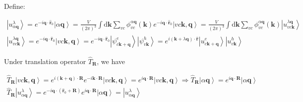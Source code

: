 \noindent
Define:

\begin{equation}
  \begin{gathered}
    \left| u_{\alpha\boldsymbol{q}}^{\lambda} \right\rangle 
    = e^{-i\boldsymbol{q} \cdot \hat{\boldsymbol{r}}_0} \left| \alpha\boldsymbol{q} \right\rangle 
    = \frac{V}{(2\pi)^3} \int \mathrm{d}\boldsymbol{k} \sum_{vc} \phi_{vc}^{\alpha \boldsymbol{q}}(\boldsymbol{k}) 
      e^{-i\boldsymbol{q} \cdot \hat{\boldsymbol{r}}_0} \left| v c \boldsymbol{k}, \boldsymbol{q} \right\rangle
    = \frac{V}{(2\pi)^3} \int \mathrm{d}\boldsymbol{k} \sum_{vc} \phi_{vc}^{\alpha \boldsymbol{q}}(\boldsymbol{k}) 
      \left| u_{v c \boldsymbol{k}}^{\lambda\boldsymbol{q}} \right\rangle \\
    \left| u_{v c \boldsymbol{k}}^{\lambda\boldsymbol{q}} \right\rangle 
    = e^{-i\boldsymbol{q} \cdot \hat{\boldsymbol{r}}_0} \left| v c \boldsymbol{k}, \boldsymbol{q} \right\rangle 
    = e^{-i\boldsymbol{q} \cdot \hat{\boldsymbol{r}}_0} 
      \left| \psi_{c\boldsymbol{k}+\boldsymbol{q}}^{e} \right\rangle \left| \psi_{v\boldsymbol{k}}^{h} \right\rangle 
    = e^{i(\boldsymbol{k}+\lambda\boldsymbol{q}) \cdot \hat{\boldsymbol{r}}} 
      \left| u_{c\boldsymbol{k}+\boldsymbol{q}}^{e} \right\rangle \left| u_{v\boldsymbol{k}}^{h} \right\rangle 
  \end{gathered}
\end{equation}

\noindent
Under translation operator $\hat{T}_{\boldsymbol{R}}$, we have

\begin{equation}
  \begin{gathered}
    \hat{T}_{\boldsymbol{R}} \left| v c \boldsymbol{k}, \boldsymbol{q} \right\rangle 
    = e^{i(\boldsymbol{k} + \boldsymbol{q})\cdot\boldsymbol{R}}e^{-i\boldsymbol{k}\cdot\boldsymbol{R}} 
      \left| v c \boldsymbol{k}, \boldsymbol{q} \right\rangle 
    = e^{i\boldsymbol{q}\cdot\boldsymbol{R}} 
      \left| v c \boldsymbol{k}, \boldsymbol{q} \right\rangle 
    \Rightarrow \hat{T}_{\boldsymbol{R}} \left| \alpha\boldsymbol{q} \right\rangle 
    = e^{i\boldsymbol{q}\cdot\boldsymbol{R}} \left| \alpha\boldsymbol{q} \right\rangle \\
    \hat{T}_{\boldsymbol{R}} \left| u_{\alpha\boldsymbol{q}}^{\lambda} \right\rangle 
    = e^{-i\boldsymbol{q} \cdot (\hat{\boldsymbol{r}}_0 + \boldsymbol{R})} e^{i\boldsymbol{q}\cdot\boldsymbol{R}} \left| \alpha\boldsymbol{q} \right\rangle 
    = \left| u_{\alpha\boldsymbol{q}}^{\lambda} \right\rangle 
  \end{gathered}
\end{equation}

